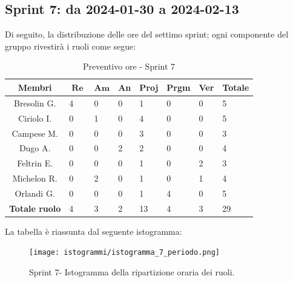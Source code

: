 \documentclass[10pt, a4paper]{article}
\begin{document}
\subsection{Sprint 7: da 2024-01-30 a 2024-02-13}
Di seguito, la distribuzione delle ore del settimo sprint; ogni componente del gruppo rivestirà i ruoli come segue:
\begin{table}[H]
\begin{tabularx}{\textwidth}{c|X|X|X|X|X|X|X}
    \textbf{Membri} & $\operatorname{\textbf{Re}}$ & $\mathrm{\textbf{Am}}$ & \textbf{An} & \textbf{Proj} & \textbf{Prgm} & \textbf{Ver} & \textbf{Totale} \\
        \hline Bresolin G. & \cellcolor{primarycolor}4 & 0 & 0 & 1 & 0 & 0 & 5 \\
        \hline Ciriolo I.  & 0 & 1 & 0 & \cellcolor{primarycolor}4 & 0 & 0 & 5 \\
        \hline Campese M.  & 0 & 0 & 0 & \cellcolor{primarycolor}3 & 0 & 0 & 3 \\
        \hline Dugo A.     & 0 & 0 & \cellcolor{primarycolor}2 & 2 & 0 & 0 & 4 \\
        \hline Feltrin E.  & 0 & 0 & 0 & 1 & 0 & \cellcolor{primarycolor}2 & 3 \\
        \hline Michelon R. & 0 & \cellcolor{primarycolor}2 & 0 & 1 & 0 & 1 & 4 \\
        \hline Orlandi G.  & 0 & 0 & 0 & 1 & \cellcolor{primarycolor}4 & 0 & 5 \\
        \hline
        \textbf{Totale ruolo} & 4 & 3 & 2 & 13 & 4 & 3 & 29 
    \end{tabularx}
    \caption{Preventivo ore - Sprint 7}
    \end{table}

La tabella è riassunta dal seguente istogramma:
 \begin{figure}[H]
        \centering        
        \texttt{[image: istogrammi/istogramma\_7\_periodo.png]}
        \caption{Sprint 7- Istogramma della ripartizione oraria dei ruoli. }
    \end{figure}
\end{document}
